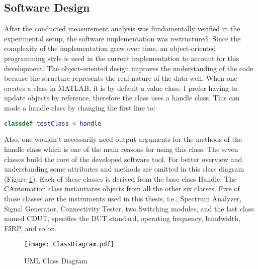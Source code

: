 \subsection{Software Design}
After the conducted measurement analysis was fundamentally verified in the experimental setup, the software implementation was restructured. Since the complexity of the implementation grew over time, an object-oriented programming style is used in the current implementation to account for this development. The object-oriented design improves the understanding of the code because the structure represents the real nature of the data well. When one creates a class in MATLAB\textregistered{}, it is by default a value class. I prefer having to update objects by reference, therefore the class uses a handle class. This can made a handle class by changing the first line to:
\begin{lstlisting}[language=MATLAB]
classdef testClass < handle
\end{lstlisting}
Also, one wouldn't necessarily need output arguments for the methods of the handle class which is one of the main reasons for using this class. The seven classes build the core of the developed software tool. For better overview and understanding some attributes and methods are omitted in this class diagram (Figure \ref{fig:cd}). Each of these classes is derived from the base class Handle. The CAutomation class instantiates objects from all the other six classes. Five of those classes are the instruments used in this thesis, i.e., Spectrum Analyzer, Signal Generator, Connectivity Tester, two Switching modules, and the last class named CDUT, specifies the \acs{DUT} standard, operating frequency, bandwidth, \acs{EIRP}, and so on.

\begin{figure}[H]
\centering
\texttt{[image: ClassDiagram.pdf]}
\caption{UML Class Diagram}
\label{fig:cd} 
\end{figure}



